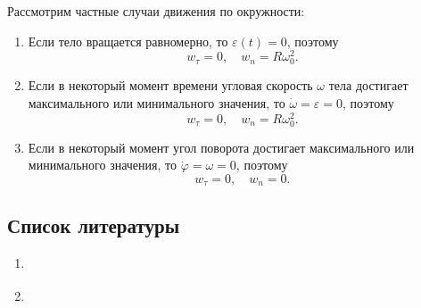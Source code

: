 Рассмотрим частные случаи движения по окружности:
\begin{enumerate}
  \item Если тело вращается равномерно, то $\varepsilon(t) = 0$, поэтому
    \begin{equation*}
      w_\tau = 0, \quad w_n = R \omega_0^2.
    \end{equation*}

  \item Если в некоторый момент времени угловая скорость $\omega$ тела достигает
    максимального или минимального значения, то
    $\dot{\omega} = \varepsilon = 0$, поэтому
    \begin{equation*}
      w_\tau = 0, \quad w_n = R \omega_0^2.
    \end{equation*}

  \item Если в некоторый момент угол поворота достигает максимального или
    минимального значения, то $\dot{\varphi} = \omega = 0$, поэтому
    \begin{equation*}
      w_\tau = 0, \quad w_n = 0.
    \end{equation*}
\end{enumerate}

\subsection{Список литературы}
\begin{enumerate}
  \item \cite{lectures}
  \item \cite{lourie}
\end{enumerate}

